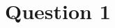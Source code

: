 \documentclass[../mesure.tex]{subfiles}
\begin{document}
	\localtableofcontents

	\section{Question 1}{
		
	}
\end{document}
